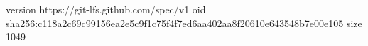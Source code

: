 version https://git-lfs.github.com/spec/v1
oid sha256:c118a2c69c99156ea2e5c9f1c75f4f7ed6aa402aa8f20610e643548b7e00e105
size 1049
